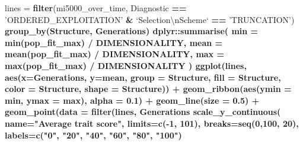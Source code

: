 \documentclass[]{book}
\newenvironment{Shaded}{\begin{snugshade}}{\end{snugshade}}
\newcommand{\CharTok}[1]{\textcolor[rgb]{0.31,0.60,0.02}{#1}}
\newcommand{\DataTypeTok}[1]{\textcolor[rgb]{0.13,0.29,0.53}{#1}}
\newcommand{\DecValTok}[1]{\textcolor[rgb]{0.00,0.00,0.81}{#1}}
\newcommand{\FloatTok}[1]{\textcolor[rgb]{0.00,0.00,0.81}{#1}}
\newcommand{\KeywordTok}[1]{\textcolor[rgb]{0.13,0.29,0.53}{\textbf{#1}}}
\newcommand{\NormalTok}[1]{#1}
\newcommand{\OperatorTok}[1]{\textcolor[rgb]{0.81,0.36,0.00}{\textbf{#1}}}
\newcommand{\StringTok}[1]{\textcolor[rgb]{0.31,0.60,0.02}{#1}}
\begin{document}
\begin{Shaded}
\begin{Highlighting}[]
\NormalTok{lines =}\StringTok{ }\KeywordTok{filter}\NormalTok{(mi5000_over_time, Diagnostic }\OperatorTok{==}\StringTok{ 'ORDERED_EXPLOITATION'} \OperatorTok{&}\StringTok{ `}\DataTypeTok{Selection}\CharTok{\textbackslash{}n}\DataTypeTok{Scheme}\StringTok{`} \OperatorTok{==}\StringTok{ 'TRUNCATION'}\NormalTok{) }\OperatorTok{%>%}
\StringTok{  }\KeywordTok{group_by}\NormalTok{(Structure, Generations) }\OperatorTok{%>%}
\StringTok{  }\NormalTok{dplyr}\OperatorTok{::}\KeywordTok{summarise}\NormalTok{(}
    \DataTypeTok{min =} \KeywordTok{min}\NormalTok{(pop_fit_max) }\OperatorTok{/}\StringTok{ }\NormalTok{DIMENSIONALITY,}
    \DataTypeTok{mean =} \KeywordTok{mean}\NormalTok{(pop_fit_max) }\OperatorTok{/}\StringTok{ }\NormalTok{DIMENSIONALITY,}
    \DataTypeTok{max =} \KeywordTok{max}\NormalTok{(pop_fit_max) }\OperatorTok{/}\StringTok{ }\NormalTok{DIMENSIONALITY}
\NormalTok{  )}
\KeywordTok{ggplot}\NormalTok{(lines, }\KeywordTok{aes}\NormalTok{(}\DataTypeTok{x=}\NormalTok{Generations, }\DataTypeTok{y=}\NormalTok{mean, }\DataTypeTok{group =}\NormalTok{ Structure, }\DataTypeTok{fill =}\NormalTok{ Structure, }\DataTypeTok{color =}\NormalTok{ Structure, }\DataTypeTok{shape =}\NormalTok{ Structure)) }\OperatorTok{+}
\StringTok{  }\KeywordTok{geom_ribbon}\NormalTok{(}\KeywordTok{aes}\NormalTok{(}\DataTypeTok{ymin =}\NormalTok{ min, }\DataTypeTok{ymax =}\NormalTok{ max), }\DataTypeTok{alpha =} \FloatTok{0.1}\NormalTok{) }\OperatorTok{+}
\StringTok{  }\KeywordTok{geom_line}\NormalTok{(}\DataTypeTok{size =} \FloatTok{0.5}\NormalTok{) }\OperatorTok{+}
\StringTok{  }\KeywordTok{geom_point}\NormalTok{(}\DataTypeTok{data =} \KeywordTok{filter}\NormalTok{(lines, Generations }\OperatorTok{%%}\StringTok{ }\DecValTok{2000} \OperatorTok{==}\StringTok{ }\DecValTok{0}\NormalTok{), }\DataTypeTok{size =} \FloatTok{2.5}\NormalTok{, }\DataTypeTok{stroke =} \FloatTok{2.0}\NormalTok{, }\DataTypeTok{alpha =} \FloatTok{1.0}\NormalTok{) }\OperatorTok{+}
\StringTok{  }\KeywordTok{scale_y_continuous}\NormalTok{(}
    \DataTypeTok{name=}\StringTok{"Average trait score"}\NormalTok{,}
    \DataTypeTok{limits=}\KeywordTok{c}\NormalTok{(}\OperatorTok{-}\DecValTok{1}\NormalTok{, }\DecValTok{101}\NormalTok{),}
    \DataTypeTok{breaks=}\KeywordTok{seq}\NormalTok{(}\DecValTok{0}\NormalTok{,}\DecValTok{100}\NormalTok{, }\DecValTok{20}\NormalTok{),}
    \DataTypeTok{labels=}\KeywordTok{c}\NormalTok{(}\StringTok{"0"}\NormalTok{, }\StringTok{"20"}\NormalTok{, }\StringTok{"40"}\NormalTok{, }\StringTok{"60"}\NormalTok{, }\StringTok{"80"}\NormalTok{, }\StringTok{"100"}\NormalTok{)}
}}}
\end{Highlighting}
\end{Shaded}
\end{document}
